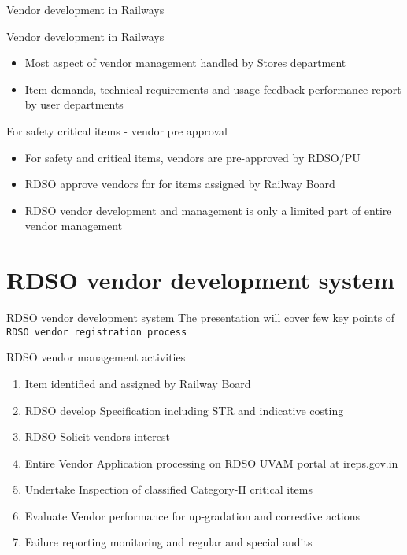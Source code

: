 \documentclass[
  10pt,
  ignorenonframetext,
  aspectratio=43,
]{beamer}
\providecommand{\tightlist}{%
  \setlength{\itemsep}{0pt}\setlength{\parskip}{0pt}}
\begin{document}
\begin{frame}{Vendor development in Railways}
\begin{block}{Vendor development in Railways}
\protect\hypertarget{vendor-development-in-railways-1}{}
\begin{itemize}
\tightlist
\item
  Most aspect of vendor management handled by Stores department
\item
  Item demands, technical requirements and usage feedback performance
  report by user departments
\end{itemize}
\end{block}

\begin{block}{For safety critical items - vendor pre approval}
\protect\hypertarget{for-safety-critical-items---vendor-pre-approval}{}
\begin{itemize}
\tightlist
\item
  For safety and critical items, vendors are pre-approved by RDSO/PU
\item
  RDSO approve vendors for for items assigned by Railway Board
\item
  RDSO vendor development and management is only a limited part of
  entire vendor management
\end{itemize}
\end{block}
\end{frame}

\hypertarget{rdso-vendor-development-system}{%
\section{RDSO vendor development
system}\label{rdso-vendor-development-system}}

\begin{frame}[fragile]{RDSO vendor development system}
The presentation will cover few key points of
\texttt{RDSO\ vendor\ registration\ process}

\begin{block}{RDSO vendor management activities}
\protect\hypertarget{rdso-vendor-management-activities}{}
\begin{enumerate}
\tightlist
\item
  Item identified and assigned by Railway Board
\item
  RDSO develop Specification including STR and indicative costing
\item
  RDSO Solicit vendors interest
\item
  Entire Vendor Application processing on RDSO UVAM portal at
  ireps.gov.in
\item
  Undertake Inspection of classified Category-II critical items
\item
  Evaluate Vendor performance for up-gradation and corrective actions
\item
  Failure reporting monitoring and regular and special audits
\end{enumerate}
\end{block}
\end{frame}
\end{document}
